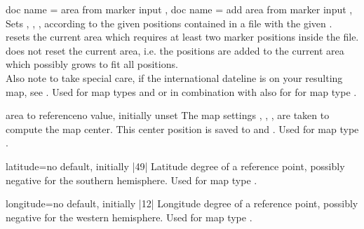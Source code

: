 \begin{docMrcKeys}[
  doc keypath     = supply,
  doc parameter   = {=\marg{file name}},
  doc description = {no default},
  doc new         = 2020-05-08,
]{
  { doc name = area from marker input },
  { doc name = add area from marker input },
}
  Sets
  , ,
  , 
  according to the given  positions contained in a
  file with the given .\\
   resets the current area which requires
  at least two marker positions inside the file.\\
   does not reset the current area,
  i.e. the positions are added to the
  current area which possibly grows to fit all positions.\\
  Also note to take special care, if the international dateline is on your
  resulting map, see .
  Used for map types  and 
  or in combination with  also
  for for map type .
\end{docMrcKeys}



\begin{docMrcKey}[supply]{area to reference}{}{no value, initially unset}
  The map settings
  , ,
  , 
  are taken to compute the map center. This center position is saved
  to  and .
  Used for map type .
\end{docMrcKey}


\clearpage

\begin{docMrcKey}[supply]{latitude}{=}{no default, initially |49|}
  Latitude degree of a reference point, possibly negative for the southern hemisphere.
  Used for map type .
\end{docMrcKey}

\begin{docMrcKey}[supply]{longitude}{=}{no default, initially |12|}
  Longitude degree of a reference point, possibly negative for the western hemisphere.
  Used for map type .
\end{docMrcKey}


